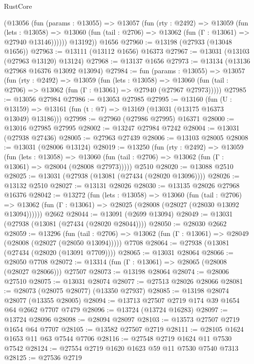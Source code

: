 \begin{lexlean}{RustCore}
\begin{coremodule}
        (@13056
          (fun (params : @13055) =>
          @13057
            (fun (rty : @2492) =>
            @13059
              (fun (lets : @13058) =>
              @13060 (fun (tail : @2706) => @13062 (fun (Γ : @13061) => @27940 @13146))))))
        @13192))
    @1656
@27960 := @13198 (@27933 (@13048 @1656))
@27963 := @13111 (@13112 @1656) @16373
@27967 := @13031 (@13103 (@27963 @13120) @13124)
@27968 := @13137 @1656
@27973 := @13134 (@13136 @27968 @16376 @13092 @13094)
@27984 := fun (params : @13055) =>
  @13057
    (fun (rty : @2492) =>
    @13059
      (fun (lets : @13058) =>
      @13060 (fun (tail : @2706) => @13062 (fun (Γ : @13061) => @27940 (@27967 @27973)))))
@27985 := @13056 @27984
@27986 := @13053 @27985
@27995 := @13160
    (fun (U : @13159) => @13161 (fun (t : @7) => @13169 (@13031 (@13175 @16373 @13049) @13186)))
@27998 := @27960 (@27986 @27995) @16371
@28000 := @13016 @27985 @27995
@28002 := @13247 @27984 @7242
@28004 := @13031 (@27938 @27436)
@28005 := @27963 @27439
@28006 := @13103 @28005
@28008 := @13031 (@28006 @13124)
@28019 := @13250
    (fun (rty : @2492) =>
    @13059
      (fun (lets : @13058) =>
      @13060 (fun (tail : @2706) => @13062 (fun (Γ : @13061) => @28004 (@28008 @27973)))))
    @2510
@28020 := @13088 @2510
@28025 := @13031 (@27938 (@13081 (@27434 (@28020 @13096))))
@28026 := @13132 @2510
@28027 := @13131 @28026
@28030 := @13135 @28026 @27968 @16376
@28042 := @13272
    (fun (lets : @13058) =>
    @13060
      (fun (tail : @2706) =>
      @13062 (fun (Γ : @13061) => @28025 (@28008 (@28027 (@28030 @13092 @13094))))))
    @2662
@28044 := @13091 (@2699 @13094)
@28049 := @13031 (@27938 (@13081 (@27434 (@28020 @28044))))
@28050 := @28030 @2662
@28059 := @13296
    (fun (tail : @2706) => @13062 (fun (Γ : @13061) => @28049 (@28008 (@28027 (@28050 @13094)))))
    @7708
@28064 := @27938 (@13081 (@27434 (@28020 (@13091 @7709))))
@28065 := @13031 @28064
@28066 := @28050 @7708
@28072 := @13314 (fun (Γ : @13061) => @28065 (@28008 (@28027 @28066))) @27507
@28073 := @13198 @28064
@28074 := @28006 @27510
@28075 := @13031 @28074
@28077 := @27513 @28026 @28066
@28081 := @28073 (@28075 @28077) (@13350 @27937)
@28085 := @13198 @28074 @28077 (@13355 @28005)
@28094 := @13713 @27507 @2719 @174 @39 @1654 @64 @2662 @7707 @7479
@28096 := @13724 (@13724 @16283)
@28097 := @13724 @28096
@28098 := @28094 @28097
@28103 := @13573 @27507 @2719 @1654 @64 @7707
@28105 := @13582 @27507 @2719
@28111 := @28105 @1624 @1653 @11 @63 @7544 @7706
@28116 := @27548 @2719 @1624 @11 @7530 @7542
@28124 := @27554 @2719 @1620 @1623 @59 @11 @7530 @7540 @7313
@28125 := @27536 @2719

\end{coremodule}
\end{lexlean}
